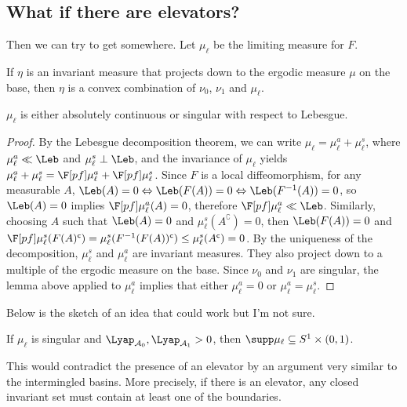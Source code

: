 \documentclass[main]{subfiles}
\begin{document}
\subsection*{What if there are elevators?}
\newcommand\ml{\mu_\ell}
\newcommand\mla{\ml^a}
\newcommand\mls{\ml^s}
Then we can try to get somewhere. Let \(\ml\) be the limiting measure for \(F\).

\begin{lemma}
  If \(\eta\) is an invariant measure that projects down to the ergodic measure \(\mu\) on the base, then \(\eta\) is a convex combination of \(\nu_0\), \(\nu_1\) and \(\ml\).
\end{lemma}

\begin{corollary}
  \(\ml\) is either absolutely continuous or singular with respect to Lebesgue.
\end{corollary}

\begin{proof}
  By the Lebesgue decomposition theorem, we can write \(\ml = \mla + \mls\), where \(\mla \ll \Leb\) and \(\mls \perp \Leb\), and the invariance of \(\ml\) yields \(\mla + \mls = \F[pf]\mla + \F[pf]\mls\). Since \(F\) is a local diffeomorphism, for any measurable \(A\), \(\Leb(A)=0 \Leftrightarrow \Leb(F(A))=0 \Leftrightarrow \Leb(F^{-1}(A))=0\), so \(\Leb(A)=0\) implies \(\F[pf]\mla(A)=0\), therefore \(\F[pf]\mla \ll \Leb\). Similarly, choosing \(A\) such that \(\Leb(A)=0\) and \(\mls(A^\complement)=0\), then \(\Leb(F(A))=0\) and \(\F[pf]\mls(F(A)^\complement)=\mls(F^{-1}(F(A))^\complement) \leq \mls(A^\complement)=0\). By the uniqueness of the decomposition, \(\mls\) and \(\mla\) are invariant measures. They also project down to a multiple of the ergodic  measure on the base. Since \(\nu_0\) and \(\nu_1\) are singular, the lemma above applied to \(\mla\) implies that either \(\mla =0\) or \(\mla = \mls\).
\end{proof}

Below is the sketch of an idea that could work but I'm not sure.
\begin{lemma}
  If \(\ml\) is singular and \(\Lyap_{\mathcal{A}_0},\Lyap_{\mathcal{A}_1}>0\), then \(\supp \ml \subseteq S^1 \times (0,1)\).
\end{lemma}
This would contradict the presence of an elevator by an argument very similar to the intermingled basins. More precisely, if there is an elevator, any closed invariant set must contain at least one of the boundaries.

\end{document}
